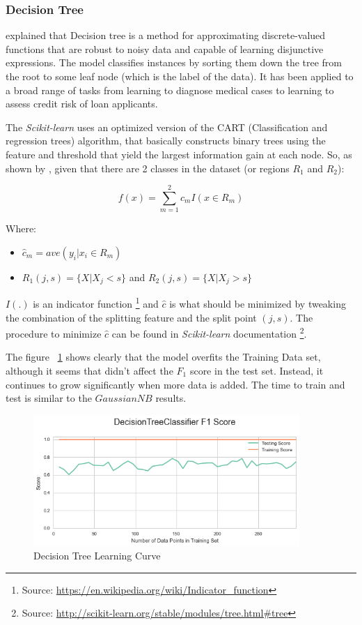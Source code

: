 \documentclass[a4paper]{article}
\begin{document}
\subsubsection{Decision Tree}

\cite{Mitchell} explained that Decision tree is a method for approximating discrete-valued functions that are robust to noisy data and capable of learning disjunctive expressions. The model classifies instances by sorting them down the tree from the root to some leaf node (which is the label of the data).  It has been applied to a broad range of tasks from learning to diagnose medical cases to learning to assess credit risk of loan applicants.

The \textit{Scikit-learn} uses an optimized version of the CART (Classification and regression trees) algorithm, that basically constructs binary trees using the feature and threshold that yield the largest information gain at each node. So, as shown by \cite{Hastie_2009}, given that there are 2 classes in the dataset (or regions $R_1$ and $R_2$):

$$f(x) = \sum_{m=1}^2 c_m I(x \in R_m)$$

Where:
\begin{itemize}
\item $\hat{c}_m = ave(y_i|x_i \in R_m)$
\item $R_1 (j,s) = \{ X | X_{j}<s\}$ and $R_2 (j,s) = \{ X | X_{j}>s\}$
\end{itemize}

$I(.)$ is an indicator function \footnote{Source: \url{https://en.wikipedia.org/wiki/Indicator_function}} and $\hat c$ is what should be minimized by tweaking the combination of the splitting feature and the split point $(j,s)$. The procedure to minimize $\hat c$ can be found in \textit{Scikit-learn} documentation \footnote{Source: \url{http://scikit-learn.org/stable/modules/tree.html\#tree}}.

The figure ~\ref{fig:DT} shows clearly that the model overfits the Training Data set, although it seems that didn't affect the $F_1$ score in the test set. Instead, it continues to grow significantly when more data is added. The time to train and test is similar to the $GaussianNB$ results.

\begin{figure}[ht!]
\centering
\includegraphics[width=0.9\textwidth]{figures/DT.png}
\caption{\label{fig:DT}Decision Tree Learning Curve}
\end{figure}
\end{document}
